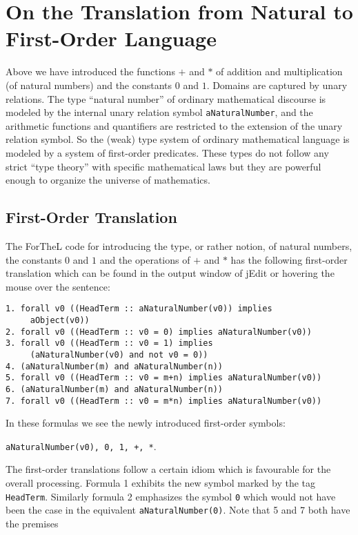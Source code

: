 \documentclass{stex}
\begin{document}
\section{On the Translation from Natural to First-Order Language}

Above we have introduced
the functions $+$ and $*$ of addition and multiplication
(of natural numbers)
and the constants $0$ and $1$. Domains are captured by
unary relations. The type ``natural number''
of ordinary mathematical discourse is modeled by the
internal unary relation symbol
\verb+aNaturalNumber+, and the arithmetic functions and
quantifiers are
restricted to the extension of the unary relation symbol.
So the (weak) type system of ordinary mathematical language
is modeled by a system of first-order predicates. These
types do not follow any strict ``type theory'' with specific
mathematical laws but they are powerful enough
to organize the universe of mathematics.

\subsection{First-Order Translation}
The ForTheL code for introducing the type, or rather
notion, of natural numbers, the constants $0$ and $1$
and the operations of $+$ and $*$ has the following
first-order translation
which can be found in the output
window of jEdit or hovering the mouse
over the sentence:
\begin{small}
\begin{verbatim}
1. forall v0 ((HeadTerm :: aNaturalNumber(v0)) implies
     aObject(v0))
2. forall v0 ((HeadTerm :: v0 = 0) implies aNaturalNumber(v0))
3. forall v0 ((HeadTerm :: v0 = 1) implies
     (aNaturalNumber(v0) and not v0 = 0))
4. (aNaturalNumber(m) and aNaturalNumber(n))
5. forall v0 ((HeadTerm :: v0 = m+n) implies aNaturalNumber(v0))
6. (aNaturalNumber(m) and aNaturalNumber(n))
7. forall v0 ((HeadTerm :: v0 = m*n) implies aNaturalNumber(v0))
\end{verbatim}
\end{small}
In these formulas we see the newly introduced first-order symbols:

\verb_aNaturalNumber(v0), 0, 1, +, *_.

The first-order translations follow a certain idiom which
is favourable for the overall processing. Formula 1
exhibits
the new symbol marked by the tag \verb+HeadTerm+. Similarly
formula 2 emphasizes the symbol \verb+0+ which would not have been
the case in the equivalent \verb+aNaturalNumber(0)+.
Note that 5 and 7 both have the premises
\end{document}
